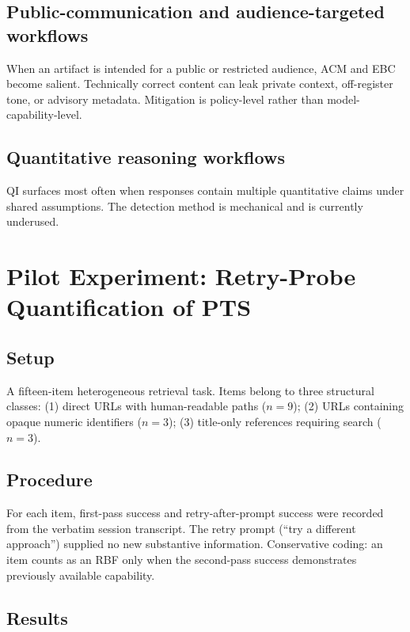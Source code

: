 \documentclass[11pt]{article}
\begin{document}
\subsection{Public-communication and audience-targeted workflows}
When an artifact is intended for a public or restricted audience, ACM and EBC become salient. Technically correct content can leak private context, off-register tone, or advisory metadata. Mitigation is policy-level rather than model-capability-level.

\subsection{Quantitative reasoning workflows}
QI surfaces most often when responses contain multiple quantitative claims under shared assumptions. The detection method is mechanical and is currently underused.

\section{Pilot Experiment: Retry-Probe Quantification of PTS}
\label{sec:pilot}

\subsection{Setup}
A fifteen-item heterogeneous retrieval task. Items belong to three structural classes: (1) direct URLs with human-readable paths ($n=9$); (2) URLs containing opaque numeric identifiers ($n=3$); (3) title-only references requiring search ($n=3$).

\subsection{Procedure}
For each item, first-pass success and retry-after-prompt success were recorded from the verbatim session transcript. The retry prompt (``try a different approach'') supplied no new substantive information. Conservative coding: an item counts as an RBF only when the second-pass success demonstrates previously available capability.

\subsection{Results}
\end{document}
